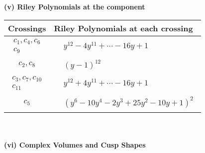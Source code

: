 \documentclass[1p]{elsarticle_modified}
\theoremstyle{definition}
\begin{document}
\newpage\renewcommand{\arraystretch}{1}
\flushleft \textbf{(v) Riley Polynomials at the component}\newline \\
\begin{tabular}{m{50pt}|m{274pt}}
Crossings & \hspace{64pt}Riley Polynomials at each crossing \\
\hline $$\begin{aligned}c_{1},c_{4},c_{6}\\c_{9}\end{aligned}$$&$\begin{aligned}
&y^{12}-4 y^{11}+\cdots-16 y+1
\end{aligned}$\\
\hline $$\begin{aligned}c_{2},c_{8}\end{aligned}$$&$\begin{aligned}
&(y-1)^{12}
\end{aligned}$\\
\hline $$\begin{aligned}c_{3},c_{7},c_{10}\\c_{11}\end{aligned}$$&$\begin{aligned}
&y^{12}+4 y^{11}+\cdots-16 y+1
\end{aligned}$\\
\hline $$\begin{aligned}c_{5}\end{aligned}$$&$\begin{aligned}
&(y^6-10 y^4-2 y^3+25 y^2-10 y+1)^2
\end{aligned}$\\
\hline
\end{tabular}\\~\\
\newpage\flushleft \textbf{(vi) Complex Volumes and Cusp Shapes}
\end{document}
